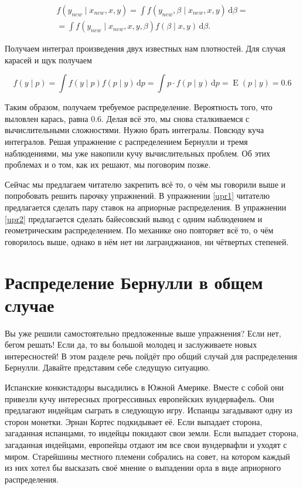 \documentclass[12pt, a4paper, oneside]{extreport}
\DeclareMathOperator{\E}{\mathop{E}}
\def \b{\beta}
\newcommand{\dx}[1]{\,\mathrm{d}#1} %
\theoremstyle{plain}              %
\theoremstyle{definition}         %
\begin{document}
\begin{multline*}
f(y_{new} \mid x_{new},x, y) =\int f(y_{new}, \b \mid x_{new}, x,y) \dx{\b} = \\ =  \int f(y_{new} \mid x_{new}, x,y,\b) f(\b \mid x,y) \dx{\b}.
\end{multline*}


Получаем интеграл произведения двух известных нам плотностей. Для случая карасей и щук получаем

\[    
f(y \mid p) = \int f(y \mid p) f(p \mid y) \dx{p} = \int p \cdot f(p \mid y) \dx{p} = \E(p \mid y) = 0.6
\]

Таким образом, получаем требуемое распределение. Вероятность того, что выловлен карась, равна $0.6$. Делая всё это, мы снова сталкиваемся с вычислительными сложностями. Нужно брать интегралы. Повсюду куча интегралов. Решая упражнение с распределением Бернулли и тремя наблюдениями, мы уже накопили кучу вычислительных проблем. Об этих проблемах и о том, как их решают, мы поговорим позже.

Сейчас мы предлагаем читателю закрепить всё то, о чём мы говорили выше и попробовать решить парочку упражнений. В упражнении \ref{upr1}  читателю предлагается сделать пару ставок на априорные распределения. В упражнении \ref{upr2} предлагается сделать байесовский вывод с одним наблюдением и геометрическим распределением. По механике оно повторяет всё то, о чём говорилось выше, однако в нём нет ни лагранджианов, ни чётвертых степеней. 

\section{Распределение Бернулли в общем случае} 

Вы уже решили самостоятельно предложенные выше упражнения? Если нет, бегом решать! Если да, то вы большой молодец и заслуживаете новых интересностей! В этом разделе речь пойдёт про общий случай для распределения Бернулли. Давайте представим себе следущую ситуацию. 

Испанские конкистадоры высадились в Южной Америке. Вместе с собой они привезли кучу интересных прогрессивных европейских вундервафель. Они предлагают индейцам сыграть в следующую игру. Испанцы загадывают одну из сторон монетки. Эрнан Кортес подкидывает её. Если выпадает сторона, загаданная испанцами, то индейцы покидают свои земли. Если выпадает сторона, загаданная индейцами, европейцы отдают им все свои вундервафли и уходят с миром. Старейшины местного племени собрались на совет, на котором каждый из них хотел бы высказать своё мнение о выпадении орла в виде априорного распределения. 
\end{document}
